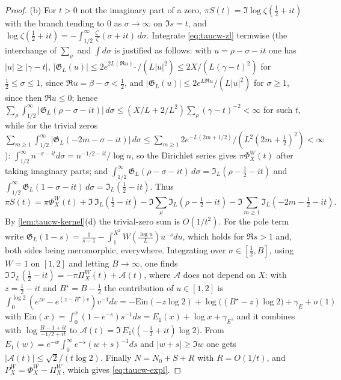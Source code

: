 \documentclass[11pt,a4paper]{article}
\numberwithin{equation}{section}
\theoremstyle{definition}
\theoremstyle{remark}
\begin{document}
\begin{proof}
(b) For $t>0$ not the imaginary part of a zero, $\pi S(t)=\Im\log\zeta(\tfrac12+it)$ with the branch tending to $0$ as $\sigma\to\infty$ on $\Im s=t$, and $\log\zeta(\tfrac12+it)=-\int_{1/2}^\infty\frac{\zeta'}{\zeta}(\sigma+it)\,d\sigma$. Integrate \eqref{eq:taucw-zl} termwise (the interchange of $\sum_\rho$ and $\int d\sigma$ is justified as follows: with $u=\rho-\sigma-it$ one has $|u|\ge|\gamma-t|$, $|\mathfrak G_L(u)|\le2e^{2L(\Re u)_+}/(L|u|^2)\le2X/(L(\gamma-t)^2)$ for $\frac12\le\sigma\le1$, since $\Re u=\beta-\sigma<\frac12$, and $|\mathfrak G_L(u)|\le2e^{L\Re u}/(L|u|^2)$ for $\sigma\ge1$, since then $\Re u\le0$; hence $\sum_\rho\int_{1/2}^\infty|\mathfrak G_L(\rho-\sigma-it)|\,d\sigma\le(X/L+2/L^2)\sum_\rho(\gamma-t)^{-2}<\infty$ for such $t$, while for the trivial zeros $\sum_{m\ge1}\int_{1/2}^\infty|\mathfrak G_L(-2m-\sigma-it)|\,d\sigma\le\sum_{m\ge1}2e^{-L(2m+1/2)}/(L^2(2m+\frac12)^2)<\infty$): $\int_{1/2}^\infty n^{-\sigma-it}d\sigma=n^{-1/2-it}/\log n$, so the Dirichlet series gives $\pi\Phi_X^W(t)$ after taking imaginary parts; and $\int_{1/2}^\infty\mathfrak G_L(\rho-\sigma-it)\,d\sigma=\mathfrak I_L(\rho-\tfrac12-it)$ and $\int_{1/2}^\infty\mathfrak G_L(1-\sigma-it)\,d\sigma=\mathfrak I_L(\tfrac12-it)$. Thus
\begin{equation}\label{eq:taucw-piS}
\pi S(t)=\pi\Phi_X^W(t)+\Im\,\mathfrak I_L(\tfrac12-it)-\Im\sum_\rho\mathfrak I_L(\rho-\tfrac12-it)-\Im\sum_{m\ge1}\mathfrak I_L(-2m-\tfrac12-it).
\end{equation}
By \cref{lem:taucw-kernel}(d) the trivial-zero sum is $O(1/t^2)$. For the pole term write $\mathfrak G_L(1-s)=\frac1{s-1}-\int_1^{X^2}W(\tfrac{\log u}L)u^{-s}du$, which holds for $\Re s>1$ and, both sides being meromorphic, everywhere. Integrating over $\sigma\in[\tfrac12,B]$, using $W=1$ on $[1,2]$ and letting $B\to\infty$, one finds $\Im\,\mathfrak I_L(\tfrac12-it)=-\pi\Pi_X^W(t)+\mathscr A(t)$, where $\mathscr A$ does not depend on $X$: with $z=\tfrac12-it$ and $B^\star=B-\tfrac12$ the contribution of $u\in[1,2]$ is $\int_0^{\log2}(e^{zv}-e^{(z-B^\star)v})v^{-1}dv=-\mathrm{Ein}(-z\log2)+\log\bigl((B^\star-z)\log2\bigr)+\gamma_E+o(1)$ with $\mathrm{Ein}(x)=\int_0^x(1-e^{-s})s^{-1}ds=E_1(x)+\log x+\gamma_E$, and it combines with $\log\frac{B-1+it}{-1/2+it}$ to $\mathscr A(t)=\Im\,E_1\bigl((-\tfrac12+it)\log2\bigr)$. From $E_1(w)=e^{-w}\int_0^\infty e^{-s}(w+s)^{-1}ds$ and $|w+s|\ge\Im w$ one gets $|\mathscr A(t)|\le\sqrt2/(t\log2)$. Finally $N=N_0+S+R$ with $R=O(1/t)$, and $P_X^W=\Phi_X^W-\Pi_X^W$, which gives \eqref{eq:taucw-expl}.
\end{proof}
\end{document}
